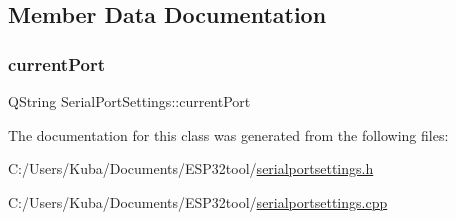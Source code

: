 \subsection{Member Data Documentation}
\mbox{\label{class_serial_port_settings_ab6d73655f68c506e50fc81b7a595aa3d}} 
\subsubsection{\texorpdfstring{current\+Port}{currentPort}}
{\footnotesize\ttfamily Q\+String Serial\+Port\+Settings\+::current\+Port}



The documentation for this class was generated from the following files\+:\begin{DoxyCompactItemize}
\item 
C\+:/\+Users/\+Kuba/\+Documents/\+E\+S\+P32tool/\hyperlink{serialportsettings_8h}{serialportsettings.\+h}\item 
C\+:/\+Users/\+Kuba/\+Documents/\+E\+S\+P32tool/\hyperlink{serialportsettings_8cpp}{serialportsettings.\+cpp}\end{DoxyCompactItemize}
